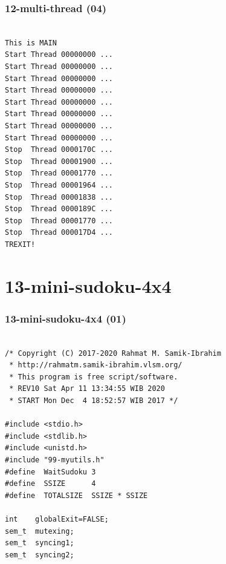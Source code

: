 \documentclass[aspectratio=169, xcolor=table, notheorems, hyperref={pdfpagelabels=false}]{beamer}
\begin{document}
\begin{frame}[fragile]
\frametitle{12-multi-thread (04)}
\begin{lstlisting}[basicstyle=\ttfamily\small]        %  65
% \begin{lstlisting}[basicstyle=\ttfamily\large]        %  54

This is MAIN
Start Thread 00000000 ...
Start Thread 00000000 ...
Start Thread 00000000 ...
Start Thread 00000000 ...
Start Thread 00000000 ...
Start Thread 00000000 ...
Start Thread 00000000 ...
Start Thread 00000000 ...
Stop  Thread 0000170C ...
Stop  Thread 00001900 ...
Stop  Thread 00001770 ...
Stop  Thread 00001964 ...
Stop  Thread 00001838 ...
Stop  Thread 0000189C ...
Stop  Thread 00001770 ...
Stop  Thread 000017D4 ...
TREXIT!

\end{lstlisting}
\end{frame}

\section{13-mini-sudoku-4x4}
\begin{frame}[fragile]
\frametitle{13-mini-sudoku-4x4 (01)}
\begin{lstlisting}[basicstyle=\ttfamily\small]        %  65
% \begin{lstlisting}[basicstyle=\ttfamily\large]        %  54

/* Copyright (C) 2017-2020 Rahmat M. Samik-Ibrahim
 * http://rahmatm.samik-ibrahim.vlsm.org/
 * This program is free script/software.
 * REV10 Sat Apr 11 13:34:55 WIB 2020
 * START Mon Dec  4 18:52:57 WIB 2017 */

#include <stdio.h>
#include <stdlib.h>
#include <unistd.h>
#include "99-myutils.h"
#define  WaitSudoku 3
#define  SSIZE      4
#define  TOTALSIZE  SSIZE * SSIZE

int    globalExit=FALSE;
sem_t  mutexing;
sem_t  syncing1;
sem_t  syncing2;

\end{lstlisting}
\end{frame}
\end{document}
